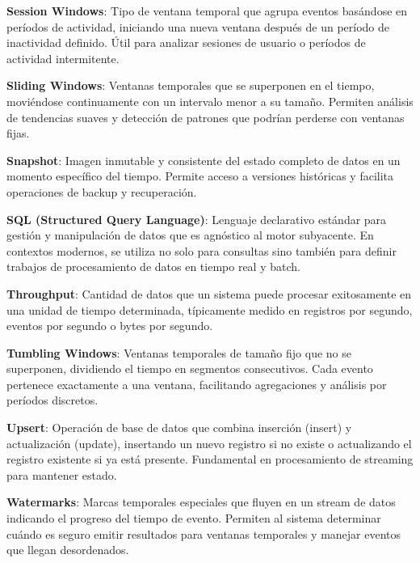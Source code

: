 \textbf{Session Windows}: Tipo de ventana temporal que agrupa eventos basándose en períodos de actividad, iniciando una nueva ventana después de un período de inactividad definido. Útil para analizar sesiones de usuario o períodos de actividad intermitente.

\textbf{Sliding Windows}: Ventanas temporales que se superponen en el tiempo, moviéndose continuamente con un intervalo menor a su tamaño. Permiten análisis de tendencias suaves y detección de patrones que podrían perderse con ventanas fijas.

\textbf{Snapshot}: Imagen inmutable y consistente del estado completo de datos en un momento específico del tiempo. Permite acceso a versiones históricas y facilita operaciones de backup y recuperación.

\textbf{SQL (Structured Query Language)}: Lenguaje declarativo estándar para gestión y manipulación de datos que es agnóstico al motor subyacente. En contextos modernos, se utiliza no solo para consultas sino también para definir trabajos de procesamiento de datos en tiempo real y batch.

\textbf{Throughput}: Cantidad de datos que un sistema puede procesar exitosamente en una unidad de tiempo determinada, típicamente medido en registros por segundo, eventos por segundo o bytes por segundo.

\textbf{Tumbling Windows}: Ventanas temporales de tamaño fijo que no se superponen, dividiendo el tiempo en segmentos consecutivos. Cada evento pertenece exactamente a una ventana, facilitando agregaciones y análisis por períodos discretos.

\textbf{Upsert}: Operación de base de datos que combina inserción (insert) y actualización (update), insertando un nuevo registro si no existe o actualizando el registro existente si ya está presente. Fundamental en procesamiento de streaming para mantener estado.

\textbf{Watermarks}: Marcas temporales especiales que fluyen en un stream de datos indicando el progreso del tiempo de evento. Permiten al sistema determinar cuándo es seguro emitir resultados para ventanas temporales y manejar eventos que llegan desordenados.

\newpage